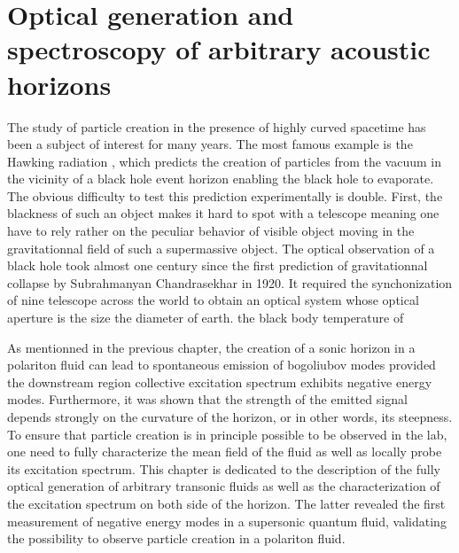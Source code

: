 

\newcommand{\kbf}{\pmb{k}}
\newcommand{\vbf}{\pmb{v}}
\newcommand{\rbf}{\pmb{r}}

\graphicspath{{./}{./fig/}{./chap3_custom_st/fig/}}

\chapter{Optical generation and spectroscopy of arbitrary acoustic horizons}

\label{chap:generation_transonic_fluid}

The study of particle creation in the presence of highly curved spacetime has been a subject of interest for many years. The most famous example is the Hawking radiation \cite{hawking_black_1972}, which predicts the creation of particles from the vacuum in the vicinity of a black hole event horizon enabling the black hole 
to evaporate. The obvious difficulty to test this prediction experimentally is double. First, the blackness of such an object makes it hard to spot with a telescope meaning one have to rely rather on the peculiar behavior of visible object moving in the gravitationnal field of such a supermassive object. The optical observation of a black hole took almost one century since the first prediction of gravitationnal collapse by Subrahmanyan Chandrasekhar in 1920. It required 
the synchonization of nine telescope across the world to obtain an optical system whose optical aperture is the size the diameter of earth. the black body temperature of 

As mentionned in the previous chapter, the creation of a sonic horizon in a polariton fluid can lead to spontaneous emission of bogoliubov modes provided the downstream region collective excitation spectrum
exhibits negative energy modes. Furthermore, it was shown that the strength of the emitted signal depends strongly on the curvature of the horizon, or in other words, its steepness. To ensure that particle creation is in principle 
possible to be observed in the lab, one need to fully characterize the mean field of the fluid as well as locally probe its excitation spectrum. This chapter is dedicated to the description of the fully optical generation of arbitrary transonic fluids as well as the characterization of the excitation spectrum on both side of the horizon. 
The latter revealed the first measurement of negative energy modes in a supersonic quantum fluid, validating the possibility to observe particle creation in a polariton fluid.

